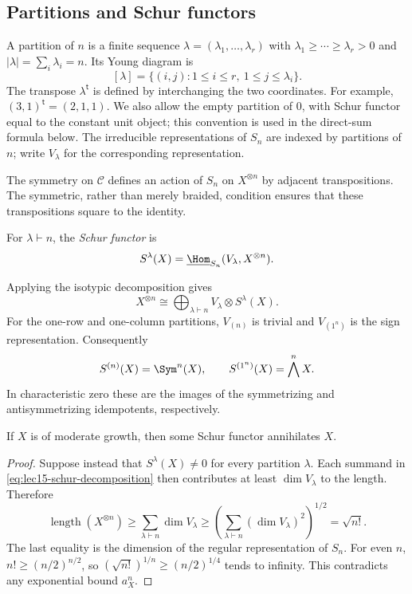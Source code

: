 \subsection{Partitions and Schur functors}

A partition of $n$ is a finite sequence
$\lambda=(\lambda_1,\ldots,\lambda_r)$ with
$\lambda_1\geq\cdots\geq\lambda_r>0$ and
$|\lambda|=\sum_i\lambda_i=n$. Its Young diagram is
\[
 [\lambda]=\{(i,j):1\leq i\leq r,\ 1\leq j\leq\lambda_i\}.
\]
The transpose $\lambda^{\mathsf t}$ is defined by interchanging the
two coordinates. For example, $(3,1)^{\mathsf t}=(2,1,1)$.
We also allow the empty partition of $0$, with Schur functor equal
to the constant unit object; this convention is used in the direct-sum
formula below.
The irreducible representations of $S_n$ are indexed by partitions of
$n$; write $V_\lambda$ for the corresponding representation.

The symmetry on $\mathcal C$ defines an action of $S_n$ on
$X^{\otimes n}$ by adjacent transpositions. The symmetric, rather
than merely braided, condition ensures that these transpositions
square to the identity.

\begin{definition}
For $\lambda\vdash n$, the \emph{Schur functor} is
\[
 S^\lambda(X)=
 \underline{\Hom}_{S_n}(V_\lambda,X^{\otimes n}).
\]
\end{definition}

Applying the isotypic decomposition gives
\begin{equation}\label{eq:lec15-schur-decomposition}
 X^{\otimes n}\cong
 \bigoplus_{\lambda\vdash n}V_\lambda\otimes S^\lambda(X).
\end{equation}
For the one-row and one-column partitions,
$V_{(n)}$ is trivial and $V_{(1^n)}$ is the sign representation.
Consequently
\[
 S^{(n)}(X)=\Sym^n(X),\qquad
 S^{(1^n)}(X)=\bigwedge^nX.
\]
In characteristic zero these are the images of the symmetrizing and
antisymmetrizing idempotents, respectively.

\begin{proposition}
If $X$ is of moderate growth, then some Schur functor annihilates $X$.
\end{proposition}
\begin{proof}
Suppose instead that $S^\lambda(X)\ne0$ for every partition $\lambda$.
Each summand in \eqref{eq:lec15-schur-decomposition} then contributes
at least $\dim V_\lambda$ to the length. Therefore
\[
 \operatorname{length}(X^{\otimes n})
 \geq\sum_{\lambda\vdash n}\dim V_\lambda
 \geq\left(\sum_{\lambda\vdash n}(\dim V_\lambda)^2\right)^{1/2}
 =\sqrt{n!}.
\]
The last equality is the dimension of the regular representation of
$S_n$. For even $n$, $n!\geq(n/2)^{n/2}$, so
$(\sqrt{n!})^{1/n}\geq(n/2)^{1/4}$ tends to infinity.
This contradicts any exponential bound $a_X^n$.
\end{proof}

